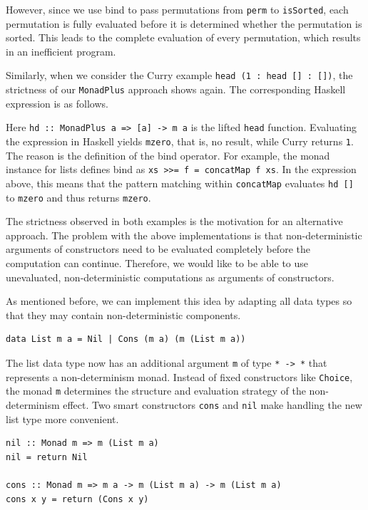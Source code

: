 \documentclass[a4paper, 11pt, fleqn, twoside]{scrreprt}
\newcommand{\hinl}[1]{\texttt{#1}}
\begin{document}
However, since we use bind to pass permutations from \hinl{perm} to \hinl{isSorted}, each permutation is fully evaluated before it is determined whether the permutation is sorted.
This leads to the complete evaluation of every permutation, which results in an inefficient program.

Similarly, when we consider the Curry example \hinl{head (1 : head [] : [])}, the strictness of our \hinl{MonadPlus} approach shows again.
The corresponding Haskell expression is as follows.


Here \hinl{hd :: MonadPlus a => [a] -> m a} is the lifted \hinl{head} function.
Evaluating the expression in Haskell yields \hinl{mzero}, that is, no result, while Curry returns \hinl{1}.
The reason is the definition of the bind operator.
For example, the monad instance for lists defines bind as \hinl{xs >>= f = concatMap f xs}.
In the expression above, this means that the pattern matching within \hinl{concatMap} evaluates \hinl{hd []} to \hinl{mzero} and thus returns \hinl{mzero}.

The strictness observed in both examples is the motivation for an alternative approach.
The problem with the above implementations is that non-deterministic arguments of constructors need to be evaluated completely before the computation can continue.
Therefore, we would like to be able to use unevaluated, non-deterministic computations as arguments of constructors.

As mentioned before, we can implement this idea by adapting all data types so that they may contain non-deterministic components.

\begin{verbatim}
data List m a = Nil | Cons (m a) (m (List m a))
\end{verbatim}

The list data type now has an additional argument \hinl{m} of type \hinl{* -> *} that represents a non-determinism monad.
Instead of fixed constructors like \hinl{Choice}, the monad \hinl{m} determines the structure and evaluation strategy of the non-determinism effect.
Two smart constructors \hinl{cons} and \hinl{nil} make handling the new list type more convenient.

\begin{verbatim}
nil :: Monad m => m (List m a)
nil = return Nil

cons :: Monad m => m a -> m (List m a) -> m (List m a)
cons x y = return (Cons x y)
\end{verbatim}
\end{document}
